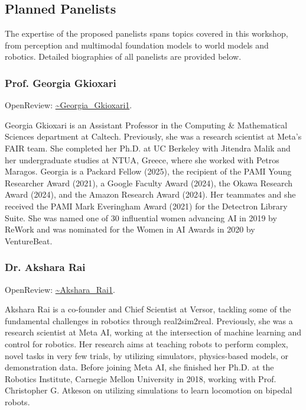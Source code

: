 \documentclass[11pt]{article}
\begin{document}
\subsection{Planned Panelists}

The expertise of the proposed panelists spans topics covered in this workshop, from perception and multimodal foundation models to world models and robotics. Detailed biographies of all panelists are provided below.


\subsubsection{Prof. Georgia Gkioxari}

OpenReview: \href{https://openreview.net/profile?id=\string~Georgia\_Gkioxari1}{\textasciitilde{}Georgia\_Gkioxari1}.


Georgia Gkioxari is an Assistant Professor in the Computing \& Mathematical Sciences department at Caltech. Previously, she was a research scientist at Meta's FAIR team. She completed her Ph.D. at UC Berkeley with Jitendra Malik and her undergraduate studies at NTUA, Greece, where she worked with Petros Maragos. Georgia is a Packard Fellow (2025), the recipient of the PAMI Young Researcher Award (2021), a Google Faculty Award (2024), the Okawa Research Award (2024), and the Amazon Research Award (2024). Her teammates and she received the PAMI Mark Everingham Award (2021) for the Detectron Library Suite. She was named one of 30 influential women advancing AI in 2019 by ReWork and was nominated for the Women in AI Awards in 2020 by VentureBeat.


\subsubsection{Dr. Akshara Rai}

OpenReview: \href{https://openreview.net/profile?id=\string~Akshara\_Rai1}{\textasciitilde{}Akshara\_Rai1}.


Akshara Rai is a co-founder and Chief Scientist at Versor, tackling some of the fundamental challenges in robotics through real2sim2real. Previously, she was a research scientist at Meta AI, working at the intersection of machine learning and control for robotics. Her research aims at teaching robots to perform complex, novel tasks in very few trials, by utilizing simulators, physics-based models, or demonstration data. Before joining Meta AI, she finished her Ph.D. at the Robotics Institute, Carnegie Mellon University in 2018, working with Prof. Christopher G. Atkeson on utilizing simulations to learn locomotion on bipedal robots.
\end{document}
